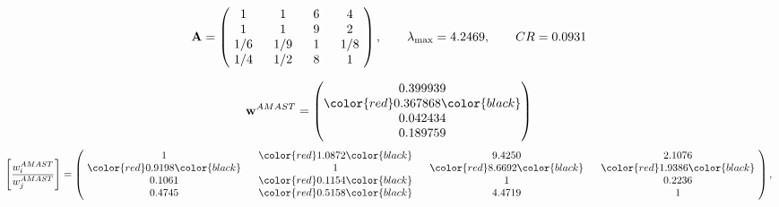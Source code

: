 \begin{example}
\begin{equation*}
\mathbf{A} =
\begin{pmatrix}
$\,\,$ 1 $\,\,$ & $\,\,$1$\,\,$ & $\,\,$6$\,\,$ & $\,\,$4 $\,\,$ \\
$\,\,$ 1 $\,\,$ & $\,\,$ 1 $\,\,$ & $\,\,$9$\,\,$ & $\,\,$2 $\,\,$ \\
$\,\,$ 1/6$\,\,$ & $\,\,$ 1/9$\,\,$ & $\,\,$ 1 $\,\,$ & $\,\,$ 1/8 $\,\,$ \\
$\,\,$ 1/4$\,\,$ & $\,\,$ 1/2$\,\,$ & $\,\,$8$\,\,$ & $\,\,$ 1  $\,\,$ \\
\end{pmatrix},
\qquad
\lambda_{\max} =
4.2469,
\qquad
CR = 0.0931
\end{equation*}

\begin{equation*}
\mathbf{w}^{AMAST} =
\begin{pmatrix}
0.399939\\
\color{red} 0.367868\color{black} \\
0.042434\\
0.189759
\end{pmatrix}\end{equation*}
\begin{equation*}
\left[ \frac{{w}^{AMAST}_i}{{w}^{AMAST}_j} \right] =
\begin{pmatrix}
$\,\,$ 1 $\,\,$ & $\,\,$\color{red} 1.0872\color{black} $\,\,$ & $\,\,$9.4250$\,\,$ & $\,\,$2.1076$\,\,$ \\
$\,\,$\color{red} 0.9198\color{black} $\,\,$ & $\,\,$ 1 $\,\,$ & $\,\,$\color{red} 8.6692\color{black} $\,\,$ & $\,\,$\color{red} 1.9386\color{black}   $\,\,$ \\
$\,\,$0.1061$\,\,$ & $\,\,$\color{red} 0.1154\color{black} $\,\,$ & $\,\,$ 1 $\,\,$ & $\,\,$0.2236 $\,\,$ \\
$\,\,$0.4745$\,\,$ & $\,\,$\color{red} 0.5158\color{black} $\,\,$ & $\,\,$4.4719$\,\,$ & $\,\,$ 1  $\,\,$ \\
\end{pmatrix},
\end{equation*}


\end{example}
